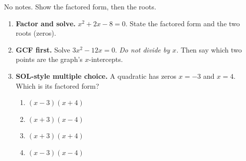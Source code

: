 \documentclass[10pt]{article}
\begin{document}

\vspace{0.12in}

No notes. Show the factored form, then the roots.

\begin{enumerate}[leftmargin=1.8em, itemsep=12pt]
  \item \textbf{Factor and solve.} $x^2+2x-8=0$. State the factored form and the two roots (zeros).
  \item \textbf{GCF first.} Solve $3x^2-12x=0$. \emph{Do not divide by $x$.} Then say which two points are
        the graph's $x$-intercepts.
  \item \textbf{SOL-style multiple choice.} A quadratic has zeros $x=-3$ and $x=4$. Which is its factored
        form?
        \begin{enumerate}[label=\Alph*., leftmargin=1.9em, itemsep=1pt]
          \item $(x-3)(x+4)$
          \item $(x+3)(x-4)$
          \item $(x+3)(x+4)$
          \item $(x-3)(x-4)$
        \end{enumerate}
\end{enumerate}
\end{document}
